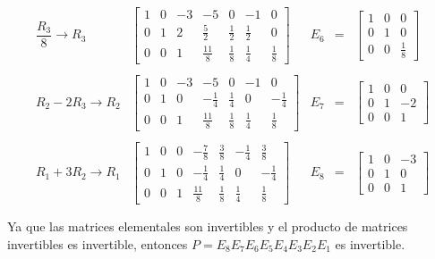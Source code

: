 \begin{enumerate}[\bfseries 1.]
	$$
	\begin{array}{rlrcl}
	    \dfrac{R_3}{8}\to R_3&
	    \left[
		\begin{array}{rrrr|rrr}
		    1 & 0 & -3 & -5 & 0 & -1 & 0 \\
		    0 & 1 & 2 & \frac{5}{2} & \frac{1}{2} & \frac{1}{2} & 0 \\
		    0 & 0 & 1 & \frac{11}{8} & \frac{1}{8} & \frac{1}{4} & \frac{1}{8}
		\end{array}
	    \right]
	    &E_6&=&
	    \left[
		\begin{array}{rrr}
		    1&0&0\\
		    0&1&0\\
		    0&0&\frac{1}{8}
		\end{array}
	    \right]\\\\
	    R_2-2R_3\to R_2&
	    \left[
		\begin{array}{rrrr|rrr}
		    1 & 0 & -3 & -5 & 0 & -1 & 0 \\
		    0 & 1 & 0 & -\frac{1}{4} & \frac{1}{4} & 0 & -\frac{1}{4} \\
		    0 & 0 & 1 & \frac{11}{8} & \frac{1}{8} & \frac{1}{4} & \frac{1}{8}
		\end{array}
	    \right]
	    &E_7&=&
	    \left[
		\begin{array}{rrr}
		    1&0&0\\
		    0&1&-2\\
		    0&0&1
		\end{array}
	    \right]\\\\
	    R_1+3R_2\to R_1&
	    \left[
		\begin{array}{rrrr|rrr}
		    1 & 0 & 0 & -\frac{7}{8} & \frac{3}{8} & -\frac{1}{4} & \frac{3}{8} \\
		    0 & 1 & 0 & -\frac{1}{4} & \frac{1}{4} & 0 & -\frac{1}{4} \\
		    0 & 0 & 1 & \frac{11}{8} & \frac{1}{8} & \frac{1}{4} & \frac{1}{8}
		\end{array}
	    \right]
	    &E_8&=&
	    \left[
		\begin{array}{rrr}
		    1&0&-3\\
		    0&1&0\\
		    0&0&1
		\end{array}
	    \right]\\\\
	\end{array}
	$$
	Ya que las matrices elementales son invertibles y el producto de matrices invertibles es invertible, entonces $P=E_8 E_7 E_6 E_5 E_4 E_3 E_2 E_1$ es invertible.

\end{enumerate}
